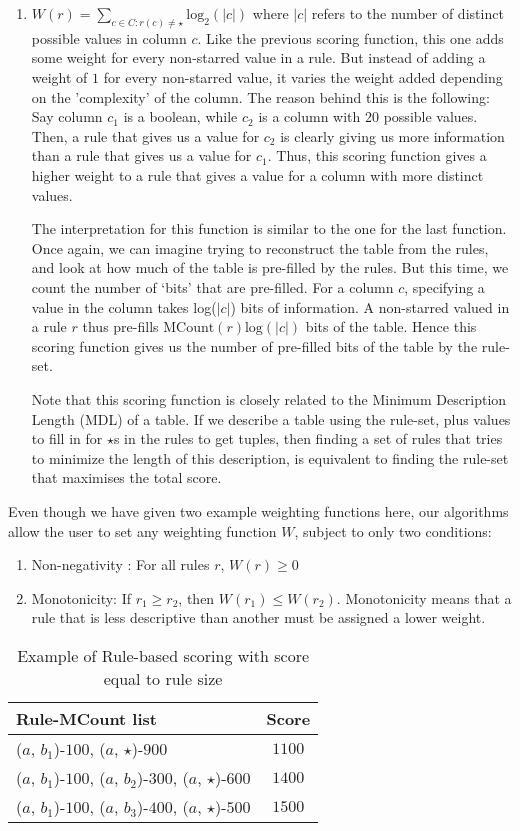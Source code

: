 \documentclass{sig-alternate}
\begin{document}
\begin{enumerate}
\item $W(r) = \sum_{c \in C : r(c) \neq \star} \text{log}_2(|c|)$ where $|c|$ refers to the number of distinct possible values in column $c$. Like the previous scoring function, this one adds some weight for every non-starred value in a rule. But instead of adding a weight of $1$ for every non-starred value, it varies the weight added depending on the 'complexity' of the column. The reason behind this is the following: Say column $c_1$ is a boolean, while $c_2$ is a column with $20$ possible values. Then, a rule that gives us a value for $c_2$ is clearly giving us more information than a rule that gives us a value for $c_1$. Thus, this scoring function gives a higher weight to a rule that gives a value for a column with more distinct values. 

The interpretation for this function is similar to the one for the last function. Once again, we can imagine trying to reconstruct the table from the rules, and look at how much of the table is pre-filled by the rules. But this time, we count the number of `bits' that are pre-filled. For a column $c$, specifying a value in the column takes log($|c|$) bits of information. A non-starred valued in a rule $r$ thus pre-fills $\text{MCount}(r) \text{log}(|c|)$ bits of the table. Hence this scoring function gives us the number of pre-filled bits of the table by the rule-set. 

Note that this scoring function is closely related to the Minimum Description Length (MDL) of a table. If we describe a table using the rule-set, plus values to fill in for $\star$s in the rules to get tuples, then finding a set of rules that tries to minimize the length of this description, is equivalent to finding the rule-set that maximises the total score. 
\end{enumerate}

Even though we have given two example weighting functions here, our algorithms allow the user to set any weighting function $W$, subject to only two conditions:
\begin{enumerate}
\item Non-negativity : For all rules $r$, $W(r) \geq 0$ 
\item Monotonicity: If $r_1 \geq r_2$, then $W(r_1) \leq W(r_2)$. Monotonicity means that a rule that is less descriptive than another must be assigned a lower weight.
\end{enumerate}

\begin{table}
\centering
\begin{tabular}{ | l | c | }
 \hline Rule-MCount list & Score \\ \hline
  ($a$, $b_1$)-$100$, ($a$, $\star$)-$900$ & $1100$ \\
  ($a$, $b_1$)-$100$, ($a$, $b_2$)-$300$, ($a$, $\star$)-$600$ & $1400$  \\
  ($a$, $b_1$)-$100$, ($a$, $b_3$)-$400$, ($a$, $\star$)-$500$ & $1500$ \\ \hline
\end{tabular}
\caption{Example of Rule-based scoring with score equal to rule size \label{table:sizescoringexample}}
\end{table}
\end{document}
